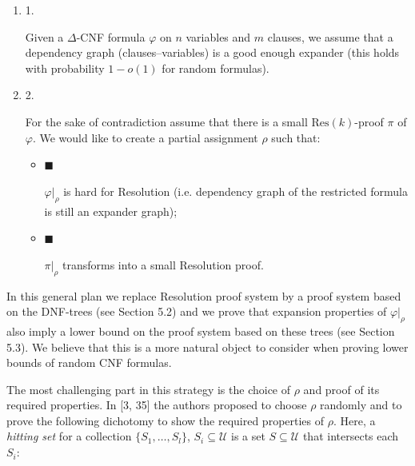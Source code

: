 \begin{enumerate}


\item[] 
1. 


Given a $\Delta$-CNF formula $\varphi$ on $n$ variables and $m$ clauses, we assume that
a dependency graph (clauses–variables) is a good enough expander (this holds with probability $1-o(1)$ for random formulas).\par





\item[] 
2. 


For the sake of contradiction assume that there is a small $\mathrm{Res}(k)$-proof $\pi$ of $\varphi$. We
would like to create a partial assignment $\rho$ such that:\par


\begin{itemize}


\item[] 
$\blacksquare$ 


$\varphi|_{\rho}$ is hard for Resolution (i.e. dependency graph of the restricted
formula is still an expander graph);\par





\item[] 
$\blacksquare$ 


$\pi|_{\rho}$ transforms into a small Resolution proof.\par





\end{itemize}





\end{enumerate}




In this general plan we replace Resolution proof system by a proof system based on the DNF-trees (see
Section 5.2) and we prove that expansion properties of $\varphi|_{\rho}$ also imply a
lower bound on the proof system based on these trees (see Section 5.3). We believe that
this is a more natural object to consider when proving lower bounds of random CNF formulas.\par




The most challenging part in this strategy is the choice of $\rho$ and proof of its required properties.
In [3, 35] the authors proposed to choose $\rho$ randomly and to
prove the following dichotomy to show the required properties of $\rho$. Here, a \emph{hitting set}
for a collection $\{S_{1},\ldots,S_{l}\}$, $S_{i}\subseteq\mathcal{U}$ is a set $S\subseteq\mathcal{U}$
that intersects each $S_{i}$:\par


